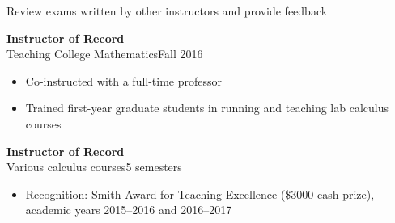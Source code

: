 \documentclass[11pt]{article}
\newcommand{\textsb}[1]{{\fontseries{sb}\selectfont #1}}
\newcommand{\thingleft}[5] {
  {\titlesize \textbf{#1}}\hfill#2\\
  \textsb{#3}\hfill#4

  {\small
    \begin{itemize}
      #5
    \end{itemize}
  }
}
\def\colheight{58.6em}%
\def\leftcolwidth{.375\textwidth}
\newcommand{\titlesize}{\large} %
\begin{document}
{\begin{minipage}[t][\colheight]{\leftcolwidth}
{      \item Review exams written by other instructors and provide feedback
    }

  \vfill

  \thingleft
    {Instructor of Record}
    {}
    {Teaching College Mathematics}
    {Fall 2016}
    {
      \item Co-instructed with a full-time professor

      \item Trained first-year graduate students in running and teaching lab
      calculus courses
    }

  \vfill

  \thingleft
    {Instructor of Record}
    {}
    {Various calculus courses}
    {5 semesters}
    {
      \item \textsb{Recognition:} Smith Award for Teaching Excellence (\$3000
      cash prize), academic years 2015--2016 and 2016--2017\vphantom{,p)}
    }

\end{minipage}
} %
%
\hfill
%
%
\end{document}
